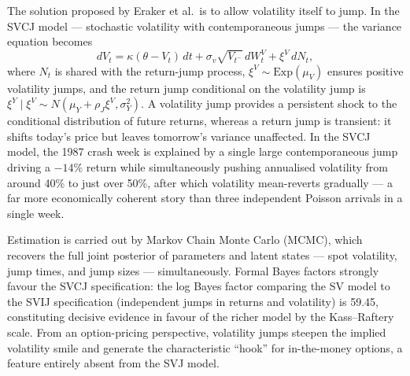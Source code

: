 \documentclass[12pt]{article}
\begin{document}
The solution proposed by Eraker et al.\ is to allow volatility itself to jump. In the SVCJ model --- stochastic volatility with contemporaneous jumps --- the variance equation becomes
\begin{equation}
dV_t = \kappa(\theta - V_t)\,dt + \sigma_v\sqrt{V_{t^-}}\,dW^V_t + \xi^V\,dN_t,
\end{equation}
where $N_t$ is shared with the return-jump process, $\xi^V \sim \mathrm{Exp}(\mu_V)$ ensures positive volatility jumps, and the return jump conditional on the volatility jump is $\xi^Y \mid \xi^V \sim N(\mu_Y + \rho_J\xi^V, \sigma_Y^2)$. A volatility jump provides a persistent shock to the conditional distribution of future returns, whereas a return jump is transient: it shifts today's price but leaves tomorrow's variance unaffected. In the SVCJ model, the 1987 crash week is explained by a single large contemporaneous jump driving a $-14\%$ return while simultaneously pushing annualised volatility from around 40\% to just over 50\%, after which volatility mean-reverts gradually --- a far more economically coherent story than three independent Poisson arrivals in a single week.

Estimation is carried out by Markov Chain Monte Carlo (MCMC), which recovers the full joint posterior of parameters and latent states --- spot volatility, jump times, and jump sizes --- simultaneously. Formal Bayes factors strongly favour the SVCJ specification: the log Bayes factor comparing the SV model to the SVIJ specification (independent jumps in returns and volatility) is 59.45, constituting decisive evidence in favour of the richer model by the Kass--Raftery scale. From an option-pricing perspective, volatility jumps steepen the implied volatility smile and generate the characteristic ``hook'' for in-the-money options, a feature entirely absent from the SVJ model.
\end{document}
